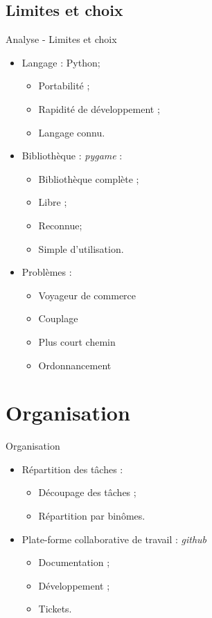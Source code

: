 \documentclass[xcolor=dvipsnames]{beamer}
\begin{document}
	\subsection{Limites et choix}
		\begin{frame}{Analyse - Limites et choix}
			\begin{itemize}
				\setlength{\itemsep}{0.3cm}
				\item Langage : Python;
					\begin{itemize}
						\item Portabilité ;
						\item Rapidité de développement ;
						\item Langage connu.
					\end{itemize}
				\item Bibliothèque : \emph{pygame} :
					\begin{itemize}
						\item Bibliothèque complète ;
						\item Libre ;
						\item Reconnue;
						\item Simple d'utilisation.
					\end{itemize}
				\item Problèmes :
					\begin{itemize}
						\item Voyageur de commerce
						\item Couplage
						\item Plus court chemin
						\item Ordonnancement
					\end{itemize}
			\end{itemize}
		\end{frame}
\section{Organisation}
	\begin{frame}{Organisation}
		\begin{itemize}
			\setlength{\itemsep}{0.75cm}
			\item Répartition des tâches :
			\begin{itemize}
			\setlength{\itemsep}{0.3cm}
				\item Découpage des tâches ;
				\item Répartition par binômes.
			\end{itemize}
			\item Plate-forme collaborative de travail : \emph{github}
			\begin{itemize}
			\setlength{\itemsep}{0.3cm}
				\item Documentation ;
				\item Développement ;
				\item Tickets.
			\end{itemize}
		\end{itemize}
	\end{frame}
\end{document}
